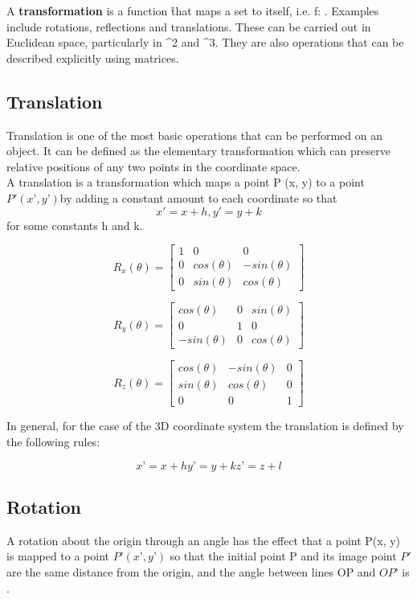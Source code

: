 \documentclass[12pt]{report}
\begin{document}
A \textbf{transformation} is a function \f that maps a set \chi to itself, i.e. f: \chi \rightarrow \chi. Examples include rotations, reflections and translations. These can be carried out in Euclidean space, particularly in ^2 and ^3. They are also operations that can be described explicitly using matrices.

\subsection{Translation}
Translation is one of the most basic operations that can be performed on an object. It can be defined as the elementary transformation which can preserve relative positions of any two points in the coordinate space. 
\vspace{0.3cm}
\\
A translation is a transformation which maps a point P (x, y) to a point $ P' (x’ , y’) $by adding a constant amount to each coordinate so that 
\[ x' = x + h, y' = y + k \] for some constants h and k.

\[ R_{x}(\theta) = \begin{bmatrix}
1 & 0 & 0 \\
0 & cos(\theta) & -sin(\theta) \\
0 & sin(\theta) & cos(\theta) 
\end{bmatrix} \]


\[ R_{y}(\theta) = \begin{bmatrix}
cos(\theta) & 0 & sin(\theta) \\
0 & 1 & 0 \\
-sin(\theta) & 0 & cos(\theta) 
\end{bmatrix} \]


\[ R_{z}(\theta) = \begin{bmatrix}
cos(\theta) & -sin(\theta) & 0 \\
sin(\theta) & cos(\theta) & 0 \\
0 & 0 & 1 
\end{bmatrix} \]

In general, for the case of the 3D coordinate system the translation is defined by the following rules:

\[ 		x’ = x + h	y’ = y + k	z’ = z + l  \]

\subsection{Rotation}

A rotation about the origin through an angle \theta has the effect that a point P(x, y) is mapped to a point $ P’ (x’ , y’) $ so that the initial point P and its image point $ P' $ are the same distance from the origin, and the angle between lines OP and $ OP’ $ is \theta.
\vspace{0.3cm}
\end{document}
